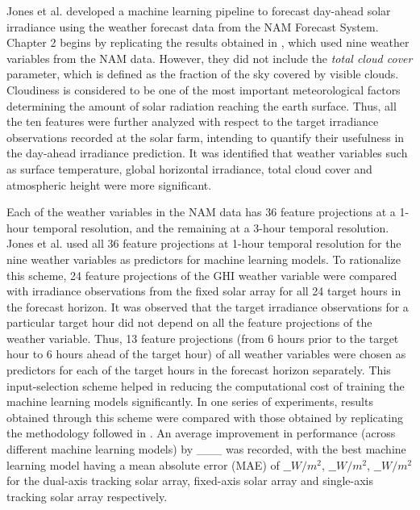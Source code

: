 \par Jones et al. \cite{thesis_zach} developed a machine learning pipeline to forecast day-ahead solar irradiance using the weather forecast data from the NAM Forecast System. Chapter 2 begins by replicating the results obtained in \cite{thesis_zach}, which used nine weather variables from the NAM data. However, they did not include the \textit{total cloud cover} parameter, which is defined as the fraction of the sky covered by visible clouds. Cloudiness is considered to be one of the most important meteorological factors determining the amount of solar radiation reaching the earth surface. Thus, all the ten features were further analyzed with respect to the target irradiance observations recorded at the solar farm, intending to quantify their usefulness in the day-ahead irradiance prediction. It was identified that weather variables such as surface temperature, global horizontal irradiance, total cloud cover and atmospheric height were more significant. 

\par Each of the weather variables in the NAM data has 36 feature projections at a 1-hour temporal resolution, and the remaining at a 3-hour temporal resolution. Jones et al. \cite{thesis_zach} used all 36 feature projections at 1-hour temporal resolution for the nine weather variables as predictors for machine learning models. To rationalize this scheme, 24 feature projections of the GHI weather variable were compared with irradiance observations from the fixed solar array for all 24 target hours in the forecast horizon. It was observed that the target irradiance observations for a particular target hour did not depend on all the feature projections of the weather variable. Thus, 13 feature projections (from 6 hours prior to the target hour to 6 hours ahead of the target hour) of all weather variables were chosen as predictors for each of the target hours in the forecast horizon separately. This input-selection scheme helped in reducing the computational cost of training the machine learning models significantly. In one series of experiments, results obtained through this scheme were compared with those obtained by replicating the methodology followed in \cite{thesis_zach}. An average improvement in performance (across different machine learning models) by \_\_\_ was recorded, with the best machine learning model having a mean absolute error (MAE) of $\_\_ W/m^2$, $\_\_ W/m^2$, $\_\_ W/m^2$ for the dual-axis tracking solar array, fixed-axis solar array and single-axis tracking solar array respectively.

